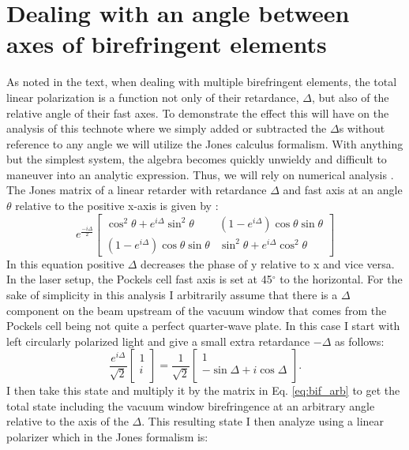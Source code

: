 \documentclass[12pt]{article}
\begin{document}
\section{\label{app:a}Dealing with an angle between axes of birefringent elements}
As noted in the text, when dealing with multiple birefringent elements, the total linear polarization is a function not only of their retardance, $\Delta$, but also of the relative angle of their fast axes. To demonstrate the effect this will have on the analysis of this technote where we simply added or subtracted the $\Delta$s without reference to any angle we will utilize the Jones calculus formalism. With anything but the simplest system, the algebra becomes quickly unwieldy and difficult to maneuver into an analytic expression. Thus, we will rely on numerical analysis . The Jones matrix of a linear retarder with retardance $\Delta$  and fast axis at an angle $\theta$ relative to the positive x-axis is given by \cite{1987Gil}:
\begin{equation}
\label{eq:bif_arb}
e^{\frac{-i\Delta}{2}}
\begin{bmatrix}
\cos^2\theta +e^{i\Delta}\sin^2\theta         & \left(1-e^{i\Delta}\right)\cos\theta\sin\theta \\
 \left(1-e^{i\Delta}\right)\cos\theta\sin\theta  & \sin^2\theta +e^{i\Delta}\cos^2\theta
\end{bmatrix}
\end{equation}
In this equation positive $\Delta$ decreases the phase of y relative to x and vice versa. In the laser setup, the Pockels cell fast axis is set at 45$^\circ$ to the horizontal. For the sake of simplicity in this analysis I arbitrarily assume that there is a $\Delta$ component on the beam upstream of the vacuum window that comes from the Pockels cell being not quite a perfect quarter-wave plate. In this case I start with left circularly polarized light and give a small extra retardance $-\Delta$ as follows:
\begin{equation}\frac{e^{i\Delta}}{\sqrt{2}}
\begin{bmatrix}
1\\
i\\
\end{bmatrix}=\frac{1}{\sqrt{2}}
\begin{bmatrix}
1\\
-\sin\Delta+i\cos\Delta\\
\end{bmatrix}.
\end{equation}
I then take this state and multiply it by the matrix in Eq. \ref{eq:bif_arb} to get the total state including the vacuum window birefringence at an arbitrary angle relative to the axis of the $\Delta$. This resulting state I then analyze using a linear polarizer which in the Jones formalism is:
\end{document}
